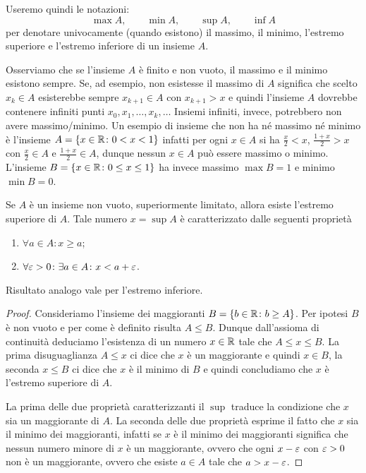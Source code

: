 Useremo quindi le notazioni:
\mynote{$\max$ $\min$ $\sup$ $\inf$}%
%
%
%
%
\index{$\sup$}%
\index{$\inf$}%
\index{$\max$}%
\index{$\min$}%
\[
 \max A, \qquad
 \min A, \qquad
 \sup A, \qquad
 \inf A
\]
per denotare univocamente (quando esistono) il massimo, il minimo,
l'estremo superiore e l'estremo inferiore di un insieme $A$.

Osserviamo che se l'insieme $A$ è finito e non vuoto,
il massimo e il minimo esistono
sempre.
Se, ad esempio, non esistesse il massimo di $A$ significa che scelto
$x_k\in A$ esisterebbe sempre $x_{k+1}\in A$ con $x_{k+1} > x$ e quindi l'insieme
$A$ dovrebbe contenere infiniti punti $x_0,x_1, \dots, x_k,\dots $
Insiemi infiniti, invece, potrebbero non avere massimo/minimo.
Un esempio di insieme che non ha né massimo né minimo è
l'insieme $A = {\left\{ x\in \mathbb R\colon 0<x<1 \right\}}$ infatti per ogni
$x\in A$ si ha $\frac x 2<x$, $\frac{1+x}{2}>x$
con $\frac x 2\in A$ e $\frac{1+x}{2}\in A$,
dunque nessun $x\in A$ può essere
massimo o minimo. L'insieme $B={\left\{ x\in \mathbb R \colon 0\le x \le 1 \right\}}$
ha invece massimo $\max B= 1$ e minimo $\min B=0$.

\begin{theorem}
\label{th:sup}
\mymark{**}
Se $A$ è un insieme non vuoto,
superiormente limitato, allora esiste l'estremo superiore di $A$.
Tale numero $x=\sup A$ è caratterizzato dalle seguenti proprietà
\begin{enumerate}
\item $\forall a\in A\colon x \ge a$;
\item $\forall \varepsilon>0\colon \exists a\in A \colon x < a + \varepsilon$.
\end{enumerate}

Risultato analogo vale per l'estremo inferiore.
\end{theorem}
%
\begin{proof}
\mymark{*}
Consideriamo l'insieme dei maggioranti
$B = {\left\{  b\in \mathbb R \colon b \ge A \right\}}$.
Per ipotesi $B$ è non vuoto e per come è definito risulta $A\le B$.
Dunque dall'assioma di continuità deduciamo l'esistenza di un numero $x\in \mathbb R$
tale che $A\le x \le B$. La prima disuguaglianza $A\le x$ ci dice che $x$ è un
maggiorante e quindi $x\in B$, la seconda $x\le B$ ci dice che $x$ è il minimo
di $B$ e quindi concludiamo che $x$ è l'estremo superiore di $A$.

La prima delle due proprietà caratterizzanti il $\sup$ traduce la condizione
che $x$ sia un maggiorante di $A$. La seconda delle due proprietà esprime il
fatto che $x$ sia il minimo dei maggioranti, infatti se $x$ è il minimo
dei maggioranti significa che nessun numero minore di $x$ è un maggiorante, ovvero
che ogni $x-\varepsilon$ con $\varepsilon>0$ non è un maggiorante, ovvero
che esiste $a\in A$ tale che $a > x-\varepsilon$.
\end{proof}


